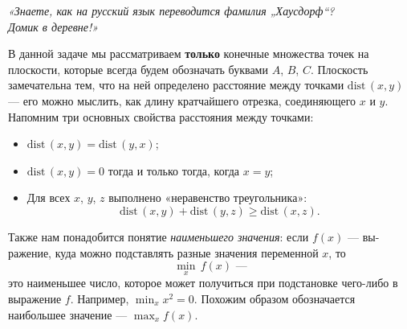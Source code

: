 ﻿%
{}
\def\dist{\mathrm{dist}\,} \def\l#1{\limits_{#1}}
\def\Dist{\mathrm{DIST}\,}

\begin{flushright} \itshape
	«Знаете, как на русский язык переводится фамилия „Хаусдорф“? \\
	Домик в деревне!»
\end{flushright}

\ms В данной задаче мы рассматриваем {\bfseries только} конечные множества точек на плоскости, которые всегда будем обозначать буквами $A$, $B$, $C$. Плоскость замечательна тем, что на ней определено расстояние между точками $\dist (x,y)$ — его можно мыслить, как длину кратчайшего отрезка, соединяющего $x$ и $y$. Напомним три основных свойства расстояния между точками:

\vspace{-0.15cm}
\begin{itemize}
	\item $\dist (x,y) = \dist (y,x)$;
	\item $\dist (x,y) = 0$ тогда и только тогда, когда $x=y$;
	\item Для всех $x$, $y$, $z$ выполнено «неравенство треугольника»:
		\vspace{-0.2cm} $$\dist (x,y) + \dist (y,z) \geq \dist (x,z).$$
\end{itemize}

\vspace{-0.4cm}
\ms Также нам понадобится понятие {\itshape наименьшего значения}: если $f(x)$ — вы- ражение, куда можно подставлять разные значения переменной $x$, то
	$$\min_x\,f(x)\text{\ \ —}$$
это наименьшее число, которое может получиться при подстановке чего-либо в выражение $f$. Например, $\min_x x^2 = 0$. Похожим образом обозначается наибольшее значение — $\max_x f(x)$.

